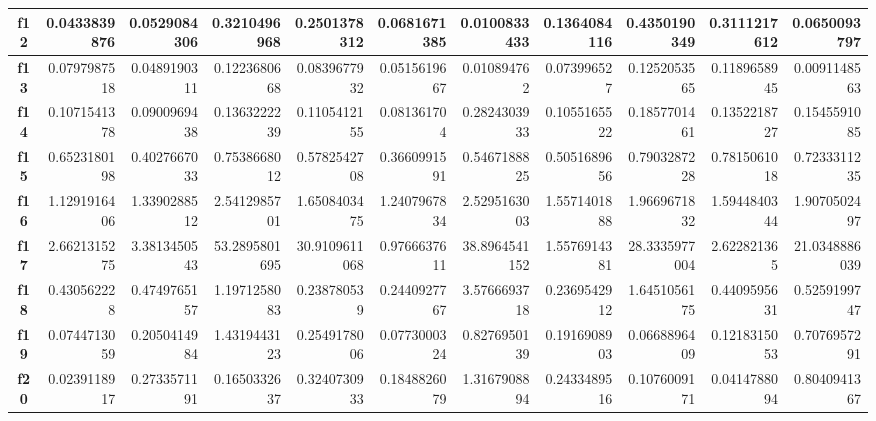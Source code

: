 \documentclass[a4paper,11pt]{article}
\begin{document}
\begin{table}[H]
\begin{adjustbox}{width=1.15\textwidth}
\begin{tabular}{|c|r|r|r|r|r|r|r|r|r|r|}
  \textbf{f12} & 0.0433839876 & 0.0529084306 & 0.3210496968 & 0.2501378312 & 0.0681671385 & 0.0100833433 & 0.1364084116 & 0.4350190349 & 0.3111217612 & 0.0650093797 \\ \hline
  \textbf{f13} & 0.0797987518 & 0.0489190311 & 0.1223680668 & 0.0839677932 & 0.0515619667 & 0.010894762 & 0.073996527 & 0.1252053565 & 0.1189658945 & 0.0091148563 \\ \hline
  \textbf{f14} & 0.1071541378 & 0.0900969438 & 0.1363222239 & 0.1105412155 & 0.081361704 & 0.2824303933 & 0.1055165522 & 0.1857701461 & 0.1352218727 & 0.1545591085 \\ \hline
  \textbf{f15} & 0.6523180198 & 0.4027667033 & 0.7538668012 & 0.5782542708 & 0.3660991591 & 0.5467188825 & 0.5051689656 & 0.7903287228 & 0.7815061018 & 0.7233311235 \\ \hline
  \textbf{f16} & 1.1291916406 & 1.3390288512 & 2.5412985701 & 1.6508403475 & 1.2407967834 & 2.5295163003 & 1.5571401888 & 1.9669671832 & 1.5944840344 & 1.9070502497 \\ \hline
  \textbf{f17} & 2.6621315275 & 3.3813450543 & 53.2895801695 & 30.9109611068 & 0.9766637611 & 38.8964541152 & 1.5576914381 & 28.3335977004 & 2.622821365 & 21.0348886039 \\ \hline
  \textbf{f18} & 0.430562228 & 0.4749765157 & 1.1971258083 & 0.238780539 & 0.2440927767 & 3.5766693718 & 0.2369542912 & 1.6451056175 & 0.4409595631 & 0.5259199747 \\ \hline
  \textbf{f19} & 0.0744713059 & 0.2050414984 & 1.4319443123 & 0.2549178006 & 0.0773000324 & 0.8276950139 & 0.1916908903 & 0.0668896409 & 0.1218315053 & 0.7076957291 \\ \hline
  \textbf{f20} & 0.0239118917 & 0.2733571191 & 0.1650332637 & 0.3240730933 & 0.1848826079 & 1.3167908894 & 0.2433489516 & 0.1076009171 & 0.0414788094 & 0.8040941367 \\ \hline
  \end{tabular}
  \end{adjustbox}
  \label{allresults10}
  \end{table}
  
\end{document}
